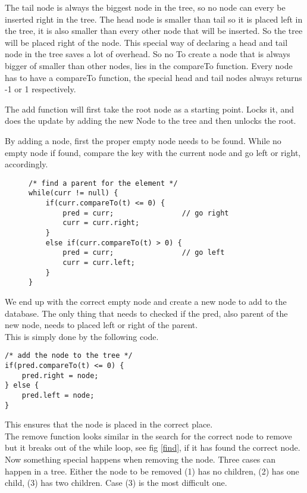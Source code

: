 \documentclass[10pt,a4paper]{article}
\begin{document}
\begin{figure}[h!]
\centerline{
}
\end{figure}

The tail node is always the biggest node in the tree, so no node can every be inserted right in the tree. The head node is smaller than tail so it is placed left in the tree, it is also smaller than every other node that will be inserted. So the tree will be placed right of the node. This special way of 
declaring a head and tail node in the tree saves a lot of overhead. So no
To create a node that is always bigger of smaller than other nodes, lies in the compareTo function. Every node has to have a compareTo function, the special head and tail nodes always returns -1 or 1 respectively.

The add function will first take the root node as a starting point. Locks it, and does the update by adding the new Node to the tree and then unlocks the root.

By adding a node, first the proper empty node needs to be found. While no empty node if found, compare the key with the current node and go left or right, accordingly. 

\begin{figure}
\center
\begin{lstlisting}
/* find a parent for the element */
while(curr != null) {
    if(curr.compareTo(t) <= 0) {
        pred = curr;				// go right
        curr = curr.right;
    }
    else if(curr.compareTo(t) > 0) {
        pred = curr;				// go left
        curr = curr.left;
    }
}
\end{lstlisting}
\label{fig:find}
\end{figure}

We end up with the correct empty node and create a new node to add to the 
database. The only thing that needs to checked if the pred, also parent of the new node, needs to placed left or right of the parent.
\\
This is simply done by the following code.
\begin{lstlisting}
/* add the node to the tree */
if(pred.compareTo(t) <= 0) {
    pred.right = node;
} else {
    pred.left = node;
}
\end{lstlisting}
This ensures that the node is placed in the correct place.
\\
The remove function looks similar in the search for the correct node to remove but it breaks out of the while loop, see fig \ref{find}, if it has found the correct node. Now something special happens when removing the node. Three cases can happen in a tree. Either the node to be removed (1) has no children, (2) has one child, (3) has two children. Case (3) is the most difficult one.
\end{document}
